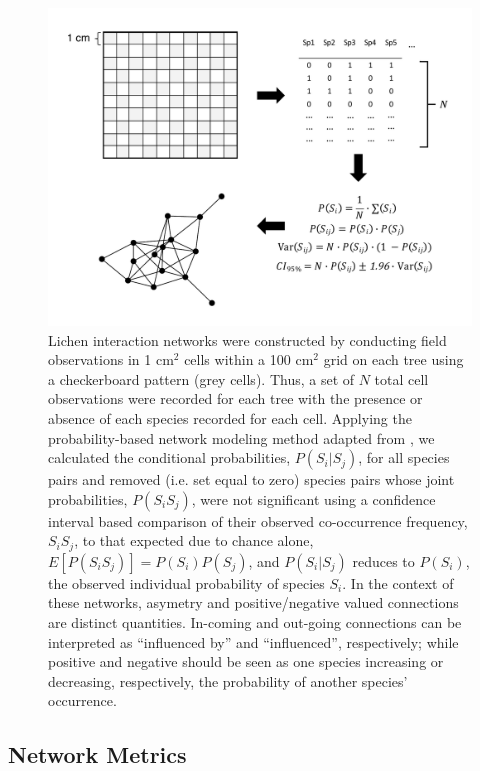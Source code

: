 \documentclass[11pt,twocolumn,twoside,lineno]{pnas-new}
\begin{document}
{\begin{figure}[ht]
\centering
\includegraphics[width=\linewidth]{lcn_araujo_method.pdf}
\caption{Lichen interaction networks were constructed by conducting
  field observations in 1 cm$^2$ cells within a 100 cm$^2$ grid on each
  tree using a checkerboard pattern (grey cells). Thus, a set of $N$
  total cell observations were recorded for each tree with the
  presence or absence of each species recorded for each cell. Applying
  the probability-based network modeling method adapted from
  \cite{Araujo2011}, we calculated the conditional probabilities,
  $P(S_i|S_j)$, for all species pairs and removed (i.e. set equal to
  zero) species pairs whose joint probabilities, $P(S_i S_j)$, were
  not significant using a confidence interval based comparison of
  their observed co-occurrence frequency, $S_iS_j$, to that expected
  due to chance alone, $E[P(S_iS_j)] = P(S_i) P(S_j)$, and
  $P(S_i|S_j)$ reduces to $P(S_i)$, the observed individual
  probability of species $S_i$. In the context of these networks,
  asymetry and positive/negative valued connections are distinct
  quantities. In-coming and out-going connections can be interpreted
  as ``influenced by'' and ``influenced'', respectively; while
  positive and negative should be seen as one species increasing or
  decreasing, respectively, the probability of another species'
  occurrence.}
\label{fig:conet_method}
\end{figure}


\subsection*{Network Metrics}

}
\end{document}
